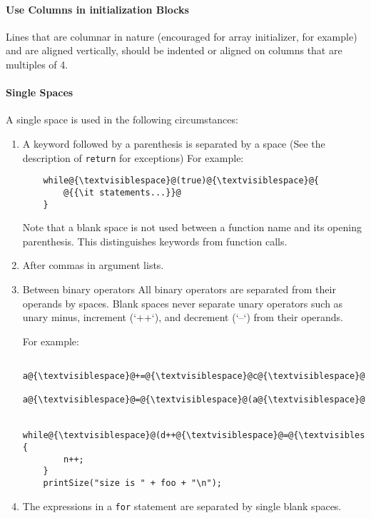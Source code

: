 \documentclass[fleqn,12pt]{PARCOneColumn} %
\begin{document}
\paragraph{Use Columns in initialization Blocks}
Lines that are columnar in nature (encouraged for array initializer, for example)
and are aligned vertically, should be indented or aligned on columns that are multiples of 4.

\paragraph{Single Spaces}
A single space is used in the following circumstances:

\begin{enumerate}
\item A keyword followed by a parenthesis is separated by a space (See the description of {\tt return} for exceptions)
For example:

\begin{lstlisting}
	while@{\textvisiblespace}@(true)@{\textvisiblespace}@{
		@{{\it statements...}}@
	}
\end{lstlisting}

Note that a blank space is not used between a function name and its opening parenthesis.
This distinguishes keywords from function calls.

\item After commas in argument lists.

\item Between binary operators
All binary operators are separated from their operands by spaces.
Blank spaces never separate unary operators such as unary minus, increment (`++`), and decrement (`--`) from their operands.

For example:

\begin{lstlisting}
    a@{\textvisiblespace}@+=@{\textvisiblespace}@c@{\textvisiblespace}@+@{\textvisiblespace}@d;
    a@{\textvisiblespace}@=@{\textvisiblespace}@(a@{\textvisiblespace}@+@{\textvisiblespace}@b)@{\textvisiblespace}@/@{\textvisiblespace}@(c@{\textvisiblespace}@*@{\textvisiblespace}@d);

    while@{\textvisiblespace}@(d++@{\textvisiblespace}@=@{\textvisiblespace}@s++) {
        n++;
    }
    printSize("size is " + foo + "\n");
\end{lstlisting}

\item The expressions in a {\tt for} statement are separated by single blank spaces.


\end{enumerate}
\end{document}

